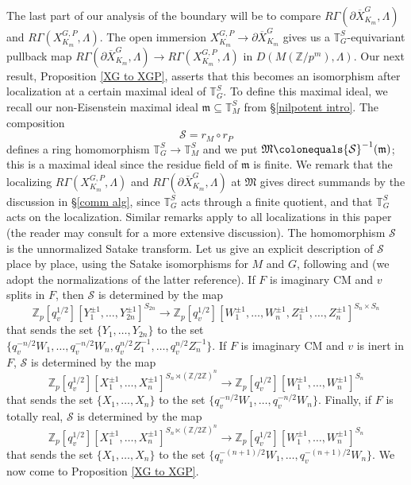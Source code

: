 \documentclass{amsart}
\theoremstyle{remark}
\numberwithin{equation}{subsection}
\newcommand{\Z}{\ZZ}
\newcommand{\TT}{{\mathbb T}}
\newcommand{\ZZ}{{\mathbb Z}}
\newcommand{\cS}{{\mathcal S}}
\newcommand{\Zp}{\Z_p}
\newcommand{\XGP}[1][m]{X^{G,P}_{K_{#1}}}
\newcommand{\ol}{\overline}
\newcommand{\mf}{\mathfrak}
\newcommand{\sub}{\subseteq}
\newcommand{\defeq}{\colonequals}
\renewcommand{\(}{\left(}
\renewcommand{\)}{\right)}
\begin{document}
The last part of our analysis of the boundary will be to compare $R\Gamma(\partial \ol{X}_{K_m}^G, \Lambda)$ and $R\Gamma(\XGP,\Lambda)$. The open immersion $\XGP \to \partial \ol{X}_{K_m}^G$ gives us a $\mathbb{T}_G^S$-equivariant pullback map $R\Gamma(\partial \ol{X}_{K_m}^G, \Lambda) \to R\Gamma(\XGP,\Lambda)$ in $D(M(\Z/p^m),\Lambda)$. Our next result, Proposition \ref{XG to XGP}, asserts that this becomes an isomorphism after localization at a certain maximal ideal of $\mathbb{T}_G^S$. To define this maximal ideal, we recall our non-Eisenstein maximal ideal $\mf{m}\sub \mathbb{T}_M^S$ from \S \ref{nilpotent intro}. The composition
\[
\cS = r_M \circ r_P
\]
defines a ring homomorphism $\mathbb{T}_G^S \to \mathbb{T}_M^S $ and we put $\mf{M} \defeq \cS^{-1}(\mf{m})$; this is a maximal ideal since the residue field of $\mf{m}$ is finite. We remark that the  localizing $R\Gamma(\XGP,\Lambda)$ and $R\Gamma(\partial \ol{X}_{K_m}^G, \Lambda)$ at $\mathfrak{M}$ gives direct summands by the discussion in \S \ref{comm alg}, since $\TT_G^S$ acts through a finite quotient, and that $\TT_G^S$ acts on the localization. Similar remarks apply to all localizations in this paper (the reader may consult \cite[\S 3.2]{newton-thorne} for a more extensive discussion). The homomorphism $\cS$ is the unnormalized Satake transform. Let us give an explicit description of $\cS$ place by place, using the Satake isomorphisms for $M$ and $G$, following \cite[Lem. 5.2.5]{scholze-galois} and \cite[Prop.-Def. 5.3]{newton-thorne} (we adopt the normalizations of the latter reference). If $F$ is imaginary CM and $v$ splits in $F$, then $\cS$ is determined by the map
\[ 
\Zp[q_v^{1/2}][Y_1^{\pm 1},\dots,Y_{2n}^{\pm 1}]^{S_{2n}} \to \Zp[q_v^{1/2}][W_1^{\pm 1},\dots,W_n^{\pm 1},Z_1^{\pm 1},\dots,Z_n^{\pm 1}]^{S_n \times S_n} 
\]
that sends the set $\{Y_1,\dots,Y_{2n}\}$ to the set $\{q_v^{-n/2} W_1,\dots,q_v^{-n/2} W_n,q_v^{n/2} Z_1^{-1},\dots,q_v^{n/2} Z_n^{-1} \}$.
If $F$ is imaginary CM and $v$ is inert in $F$, $\cS$ is determined by the map
\[ 
\Zp[q_v^{1/2}][X_1^{\pm 1},\dotsc,X_n^{\pm 1}]^{S_n \rtimes (\ZZ/2\ZZ)^n}
\to \Zp[q_v^{1/2}][W_1^{\pm 1},\dotsc,W_n^{\pm 1}]^{S_n} 
\]
that sends the set $\{ X_1,\dotsc,X_n \}$ to the set
$\{ q_v^{-n/2} W_1, \dotsc, q_v^{-n/2} W_n \}$. Finally, if $F$ is totally real, $\cS$ is determined
by the map
\[ \Zp[q_v^{1/2}][X_1^{\pm 1},\dots,X_n^{\pm 1}]^{S_n \ltimes (\ZZ/2\ZZ)^n} \to \Zp[q_v^{1/2}][W_1^{\pm 1},\dots,W_n^{\pm 1}]^{S_n} \]
that sends the set $\{X_1,\dots,X_n\}$ to the set
$\{q_v^{-(n+1)/2} W_1,\dots,q_v^{-(n+1)/2} W_n \}$. We now come to Proposition \ref{XG to XGP}.
\end{document}

